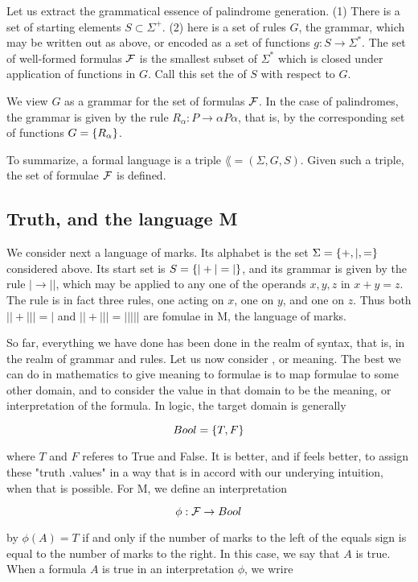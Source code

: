 Let us extract the grammatical essence of palindrome generation.  (1) There is a set of starting elements $S \subset \Sigma^+$.  (2) here is a set of rules $G$, the grammar, which may be written out as above, or encoded as a set of functions $g: S \to \Sigma^*$.  The set of well-formed formulas $\mathcal{F}$ is the smallest subset of $\Sigma^*$ which is closed under application of functions in $G$.  Call this set the  of $S$ with respect to $G$.

We view $G$ as a grammar for the set of formulas $\mathcal{F}$.  In the case of palindromes, the grammar is given by the rule $R_\alpha: P \to \alpha P \alpha$, that is, by the corresponding set of functions $G = \{  R_{\alpha } \}$.

To summarize, a formal language is a triple $\lang = (\Sigma, G, S)$.  Given such a triple, the set of formulae $\mathcal{F}$ is defined.

\subsection{Truth, and the language M}

We consider next a language of marks.  Its alphabet is the set $\Sigma = \{ +, |, = \}$ considered above.  Its start set is $S = \{  | + | = | \}$, and its grammar is given by the rule $| \to ||$, which may be applied to any one of the operands $x, y, z$ in $x + y = z$. The rule is in fact three rules, one acting on $x$, one on $y$, and one on $z$.  Thus both $|| + ||| = |$
and $|| + ||| = |||||$ are fomulae in M, the language of marks.

So far, everything we have done has been done in the realm of syntax, that is, in the realm of grammar and rules.  Let us now consider , or meaning.  The best we can do in mathematics to give meaning to formulae is to map formulae to some other domain, and to consider the value in that domain to be the meaning, or interpretation of the formula.  In logic, the target domain is generally

$$
  Bool = \{ T, F \}
$$

where $T$ and $F$ referes to True and False.  It is better, and if feels better, to assign these "truth .values" in a way that is in accord with our underying intuition, when that is possible.  For M, we define an interpretation

$$
\phi : \mathcal{F} \to Bool
$$

by $\phi(A) = T$ if and only if the number of marks to the left of the equals sign is equal to the number of marks to the right.  In this case, we say that $A$ is true.
When a formula $A$ is true in an interpretation $\phi$, we wrire

